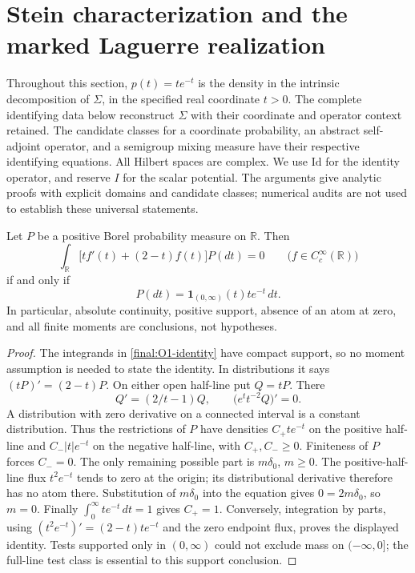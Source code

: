 \section{Stein characterization and the marked Laguerre realization}
\label{final:operators}

Throughout this section, $p(t)=te^{-t}$ is the density in the intrinsic
decomposition of $\Sigma$, in the specified real coordinate $t>0$.
The complete identifying data below reconstruct $\Sigma$ with their
coordinate and operator context retained. The candidate classes for a
coordinate probability, an abstract self-adjoint operator, and a
semigroup mixing measure have their respective identifying equations.
All Hilbert spaces are complex.  We use $\mathrm{Id}$ for the identity
operator, and reserve $I$ for the scalar potential.  The arguments give
analytic proofs with explicit domains and candidate classes; numerical
audits are not used to establish these universal statements.

\begin{theorem}
\label{final:O1}
Let $P$ be a positive Borel probability measure on $\mathbb R$.  Then
\begin{equation}\label{final:O1-identity}
 \int_{\mathbb R}\bigl[t f'(t)+(2-t)f(t)\bigr]P(dt)=0
 \qquad\bigl(f\in C_c^\infty(\mathbb R)\bigr)
\end{equation}
if and only if
\[
 P(dt)=\mathbf 1_{(0,\infty)}(t)te^{-t}\,dt.
\]
In particular, absolute continuity, positive support, absence of an atom
at zero, and all finite moments are conclusions, not hypotheses.
\end{theorem}

\begin{proof}
The integrands in \eqref{final:O1-identity} have compact support, so no
moment assumption is needed to state the identity.  In distributions it
says $(tP)'=(2-t)P$.  On either open half-line put $Q=tP$.  There
\[
 Q'=(2/t-1)Q,\qquad
 \bigl(e^t t^{-2}Q\bigr)'=0.
\]
A distribution with zero derivative on a connected interval is a constant
distribution.  Thus the restrictions of $P$ have densities
$C_+te^{-t}$ on the positive half-line and $C_-|t|e^{-t}$ on the negative
half-line, with $C_+,C_-\geq0$.  Finiteness of $P$ forces $C_-=0$.
The only remaining possible part is $m\delta_0$, $m\geq0$.
The positive-half-line flux $t^2e^{-t}$ tends to zero at the origin;
its distributional derivative therefore has no atom there.  Substitution
of $m\delta_0$ into the equation gives $0=2m\delta_0$, so $m=0$.
Finally $\int_0^\infty te^{-t}\,dt=1$ gives $C_+=1$.
Conversely, integration by parts, using
$(t^2e^{-t})'=(2-t)te^{-t}$ and the zero endpoint flux, proves the
displayed identity.  Tests supported only in $(0,\infty)$ could not
exclude mass on $(-\infty,0]$; the full-line test class is essential
to this support conclusion.
\end{proof}

